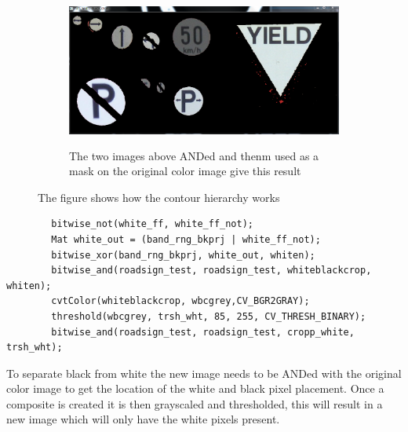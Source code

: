 \documentclass{article}
\begin{document}
\begin{figure}[H]
\center
\begin{subfigure}{0.5\textwidth}
\includegraphics[width=0.9\linewidth, height=5cm]{N_BLACK+WHITE_CROP.PNG} 
\caption{The two images above ANDed and thenm used as a mask on the original color image give this result}
\label{fig:subim1}
\end{subfigure}
\caption{The figure shows how the contour hierarchy works}
\label{fig:image2}
\end{figure}



\begin{lstlisting}
		bitwise_not(white_ff, white_ff_not);
		Mat white_out = (band_rng_bkprj | white_ff_not);
		bitwise_xor(band_rng_bkprj, white_out, whiten);
		bitwise_and(roadsign_test, roadsign_test, whiteblackcrop, whiten);
		cvtColor(whiteblackcrop, wbcgrey,CV_BGR2GRAY);
		threshold(wbcgrey, trsh_wht, 85, 255, CV_THRESH_BINARY);
		bitwise_and(roadsign_test, roadsign_test, cropp_white, trsh_wht);
\end{lstlisting}
To separate black from white the new image needs to be ANDed with the original color image to get the location of the white and black pixel placement. Once a composite is created it is then grayscaled and thresholded, this will result in a new image which will only have the white pixels present. 
\end{document}
